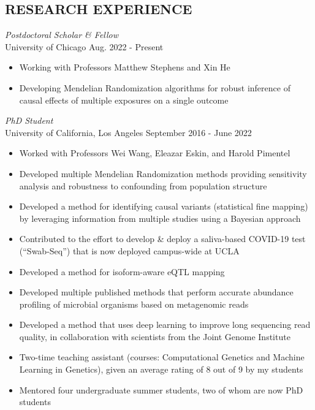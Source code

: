 \documentclass[margin, 10pt]{res} %
\begin{document}
\begin{resume}

\section{RESEARCH EXPERIENCE}

{\sl Postdoctoral Scholar \& Fellow} \\
University of Chicago \hfill Aug. 2022 - Present
\begin{itemize}
    \item Working with Professors Matthew Stephens and Xin He
    \item Developing Mendelian Randomization algorithms for robust inference of causal effects of multiple exposures on a single outcome
\end{itemize}

{\sl PhD Student} \\
University of California, Los Angeles \hfill September 2016 - June 2022
\begin{itemize} \itemsep -2pt %
\item Worked with Professors Wei Wang, Eleazar Eskin, and Harold Pimentel
\item Developed multiple Mendelian Randomization methods providing sensitivity analysis and robustness to confounding from population structure
\item Developed a method for identifying causal variants (statistical fine mapping) by leveraging information from multiple studies using a Bayesian approach 
\item Contributed to the effort to develop \& deploy a saliva-based COVID-19 test (``Swab-Seq'') that is now deployed campus-wide at UCLA
\item Developed a method for isoform-aware eQTL mapping
\item Developed multiple published methods that perform accurate abundance profiling of microbial organisms based on metagenomic reads
\item Developed a method that uses deep learning to improve long sequencing read quality, in collaboration with scientists from the Joint Genome Institute
\item Two-time teaching assistant (courses: Computational Genetics and Machine Learning in Genetics), given an average rating of 8 out of 9 by my students
\item Mentored four undergraduate summer students, two of whom are now PhD students
\end{itemize}


\end{resume}
\end{document}
